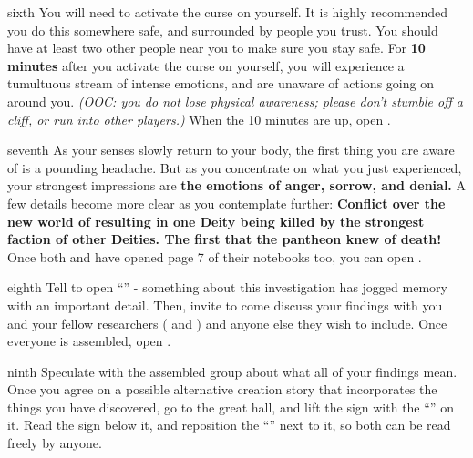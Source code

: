 \documentclass[greennotebook]{GL2020} %
\begin{document}
\begin{page}{sixth}
You will need to activate the curse on yourself. It is highly recommended you do this somewhere safe, and surrounded by people you trust. You should have at least two other people near you to make sure you stay safe.   For \textbf{10 minutes} after you activate the curse on yourself, you will experience a tumultuous stream of intense emotions, and are unaware of actions going on around you. \emph{(OOC: you do not lose physical awareness; please don’t stumble off a cliff, or run into other players.)} When the 10 minutes are up, open .
\end{page}

\begin{page}{seventh}
As your senses slowly return to your body, the first thing you are aware of is a pounding headache. But as you concentrate on what you just experienced, your strongest impressions are \textbf{the emotions of anger, sorrow, and denial.} A few details become more clear as you contemplate further: \textbf{Conflict over the new world of \pEarth{} resulting in one Deity being killed by the strongest faction of other Deities. The first that the pantheon knew of death!} Once both \cHeadScientist{} and \cScholarship{} have opened page 7 of their notebooks too, you can open .
\end{page}

\begin{page}{eighth}
Tell \cPrincipal{} to open \cPrincipal{\their} ``\mWOne{\MYname}'' - something about this investigation has jogged \cPrincipal{\their} memory with an important detail. Then, invite \cPrincipal{} to come discuss your findings with you and your fellow researchers (\cScholarship{} and \cHeadScientist{}) and anyone else they wish to include. Once everyone is assembled, open .
\end{page}

\begin{page}{ninth}
Speculate with the assembled group about what all of your findings mean. Once you agree on a possible alternative creation story that incorporates the things you have discovered, go to the great hall, and lift the sign with the ``\sCreationMythOfficial{}'' on it. Read the sign below it, and reposition the ``\sCreationMythOfficial{}'' next to it, so both can be read freely by anyone.
\end{page}

\endnotebook
\end{document}

